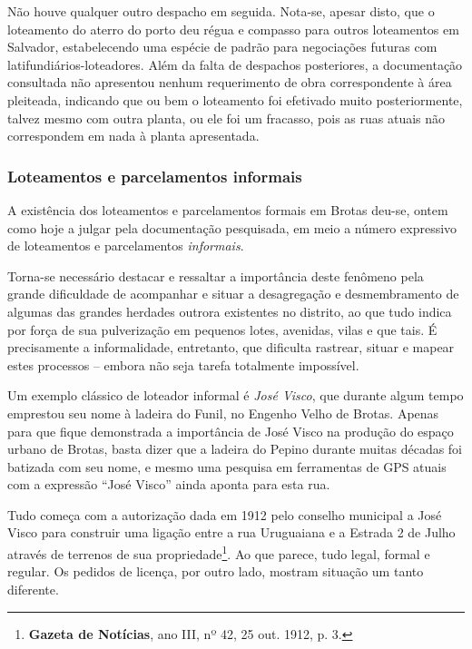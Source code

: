 Não houve qualquer outro despacho em seguida. Nota-se, apesar disto, que o loteamento do aterro do porto deu régua e compasso para outros loteamentos em Salvador, estabelecendo uma espécie de padrão para negociações futuras com latifundiários-loteadores. Além da falta de despachos posteriores, a documentação consultada não apresentou nenhum requerimento de obra correspondente à área pleiteada, indicando que ou bem o loteamento foi efetivado muito posteriormente, talvez mesmo com outra planta, ou ele foi um fracasso, pois as ruas atuais não correspondem em nada à planta apresentada.

\subsubsection{Loteamentos e parcelamentos informais}

A existência dos loteamentos e parcelamentos formais em Brotas deu-se, ontem como hoje a julgar pela documentação pesquisada, em meio a número expressivo de loteamentos e parcelamentos \textit{informais}. 

Torna-se necessário destacar e ressaltar a importância deste fenômeno pela grande dificuldade de acompanhar e situar a desagregação e desmembramento de algumas das grandes herdades outrora existentes no distrito, ao que tudo indica por força de sua pulverização em pequenos lotes, avenidas, vilas e que tais. É precisamente a informalidade, entretanto, que dificulta rastrear, situar e mapear estes processos – embora não seja tarefa totalmente impossível.

Um exemplo clássico de loteador informal é \textit{José Visco}, que durante algum tempo emprestou seu nome à ladeira do Funil, no Engenho Velho de Brotas. Apenas para que fique demonstrada a importância de José Visco na produção do espaço urbano de Brotas, basta dizer que a ladeira do Pepino durante muitas décadas foi batizada com seu nome, e mesmo uma pesquisa em ferramentas de GPS atuais com a expressão ``José Visco'' ainda aponta para esta rua.

Tudo começa com a autorização dada em 1912 pelo conselho municipal a José Visco para construir uma ligação entre a rua Uruguaiana e a Estrada 2 de Julho através de terrenos de sua propriedade\footnote{\textbf{Gazeta de Notícias}, ano III, nº 42, 25 out. 1912, p. 3.}. Ao que parece, tudo legal, formal e regular. Os pedidos de licença, por outro lado, mostram situação um tanto diferente.

